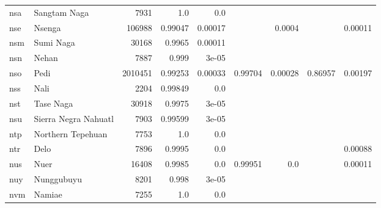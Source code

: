 \documentclass[11pt]{article}
\begin{document}
\begin{table*}[h]
{\begin{tabular}{llrrrrrrr}
nsa         & Sangtam Naga         & 7931         & 1.0         & 0.0         &          &          &          &          \\

nse         & Nsenga         & 106988         & 0.99047         & 0.00017         &          & 0.0004         &          & 0.00011         \\

nsm         & Sumi Naga         & 30168         & 0.9965         & 0.00011         &          &          &          &          \\

nsn         & Nehan         & 7887         & 0.999         & 3e-05         &          &          &          &          \\

nso         & Pedi         & 2010451         & 0.99253         & 0.00033         & 0.99704         & 0.00028         & 0.86957         & 0.00197         \\

nss         & Nali         & 2204         & 0.99849         & 0.0         &          &          &          &          \\

nst         & Tase Naga         & 30918         & 0.9975         & 3e-05         &          &          &          &          \\

nsu         & Sierra Negra Nahuatl         & 7903         & 0.99599         & 3e-05         &          &          &          &          \\

ntp         & Northern Tepehuan         & 7753         & 1.0         & 0.0         &          &          &          &          \\

ntr         & Delo         & 7896         & 0.9995         & 0.0         &          &          &          & 0.00088         \\

nus         & Nuer         & 16408         & 0.9985         & 0.0         & 0.99951         & 0.0         &          & 0.00011         \\

nuy         & Nunggubuyu         & 8201         & 0.998         & 3e-05         &          &          &          &          \\

nvm         & Namiae         & 7255         & 1.0         & 0.0         &          &          &          &          \\


\end{tabular}}
\end{table*}
\end{document}
